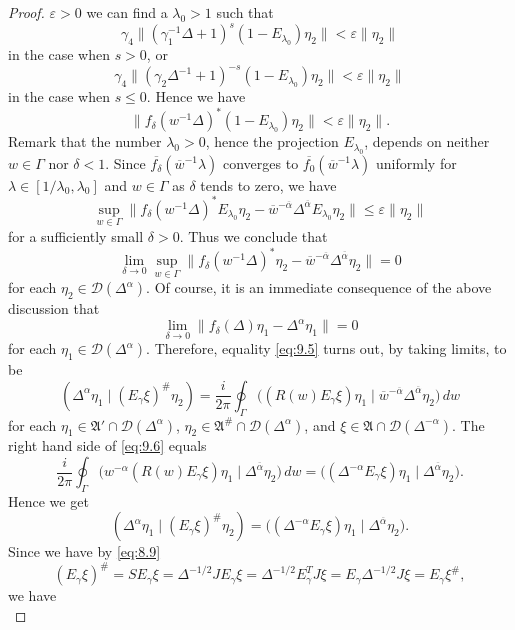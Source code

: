 \documentclass[12pt,b5paper,twoside]{article}
\theoremstyle{takesaki}
\numberwithin{equation}{section}
\begin{document}
\begin{proof}
$\varepsilon>0$ we can find a $\lambda_0>1$ such that
\[
 \gamma_4\|(\gamma_1^{-1}\Delta+1)^s(1-E_{\lambda_0})\eta_2\|
 <\varepsilon\|\eta_2\|
\]
in the case when $s>0$, or
\[
 \gamma_4\|(\gamma_2\Delta^{-1}+1)^{-s}(1-E_{\lambda_0})\eta_2\|
 <\varepsilon\|\eta_2\|
\]
in the case when $s\leq0$.  Hence we have
\[
 \|f_\delta(w^{-1}\Delta)^*(1-E_{\lambda_0})\eta_2\|
 <\varepsilon\|\eta_2\|.
\]
Remark that the number $\lambda_0>0$, hence the projection
$E_{\lambda_0}$, depends on neither $w\in\Gamma$ nor $\delta<1$.
Since $\overline{f_\delta}(\overline w^{-1}\lambda)$ converges to
$\overline{f_0}(\overline w^{-1}\lambda)$ uniformly for
$\lambda\in[1/\lambda_0,\lambda_0]$ and $w\in\Gamma$ as $\delta$
tends to zero, we have
\[
 \sup_{w\in\Gamma}
 \|f_\delta(w^{-1}\Delta)^*E_{\lambda_0}\eta_2
 -\overline w^{-\overline\alpha}\Delta^{\overline\alpha}
 E_{\lambda_0}\eta_2\|
 \leq\varepsilon\|\eta_2\|
\]
for a sufficiently small $\delta>0$.  Thus we conclude that
\[
 \lim_{\delta\to0}\sup_{w\in\Gamma}
 \|f_\delta(w^{-1}\Delta)^*\eta_2
 -\overline w^{-\overline\alpha}\Delta^{\overline\alpha}\eta_2\|=0
\]
for each $\eta_2\in\mathcal D(\Delta^\alpha)$.  Of course, it is an
immediate consequence of the above discussion that
\[
 \lim_{\delta\to0}\|f_\delta(\Delta)\eta_1
 -\Delta^\alpha\eta_1\|=0
\]
for each $\eta_1\in\mathcal D(\Delta^\alpha)$.  Therefore, equality
\eqref{eq:9.5} turns out, by taking limits, to be
\begin{equation}
 (\Delta^\alpha\eta_1\mid(E_\gamma\xi)^{\#}\eta_2)
 =\frac{i}{2\pi}\oint_\Gamma
 \bigl((R(w)E_\gamma\xi)\eta_1
 \mid\overline w^{-\overline\alpha}
 \Delta^{\overline\alpha}\eta_2\bigr)\,dw
 \tag{9.6}\label{eq:9.6}
\end{equation}
for each $\eta_1\in\mathfrak A'\cap\mathcal D(\Delta^\alpha)$,
$\eta_2\in\mathfrak A^{\#}\cap\mathcal D(\Delta^\alpha)$, and
$\xi\in\mathfrak A\cap\mathcal D(\Delta^{-\alpha})$.  The right hand
side of \eqref{eq:9.6} equals
\[
 \frac{i}{2\pi}\oint_\Gamma
 \bigl(w^{-\alpha}(R(w)E_\gamma\xi)\eta_1
 \mid\Delta^{\overline\alpha}\eta_2\bigr)\,dw
 =\bigl((\Delta^{-\alpha}E_\gamma\xi)\eta_1
 \mid\Delta^{\overline\alpha}\eta_2\bigr).
\]
Hence we get
\[
 (\Delta^\alpha\eta_1\mid(E_\gamma\xi)^{\#}\eta_2)
 =\bigl((\Delta^{-\alpha}E_\gamma\xi)\eta_1
 \mid\Delta^{\overline\alpha}\eta_2\bigr).
\]
Since we have by \eqref{eq:8.9}
\[
 (E_\gamma\xi)^{\#}=SE_\gamma\xi
 =\Delta^{-1/2}JE_\gamma\xi
 =\Delta^{-1/2}E_\gamma^TJ\xi
 =E_\gamma\Delta^{-1/2}J\xi=E_\gamma\xi^{\#},
\]
we have
\[
\]
\end{proof}
\end{document}
